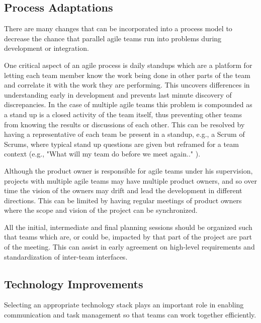 \subsection{Process Adaptations} 
\label{sec:proc_impv}
	There are many changes \cite{collabAcrossAgile_article} that can be incorporated into a process model to decrease the chance that parallel agile teams run into problems during development or integration.

One critical aspect of an agile process is daily standups which are a platform for letting each team member know the work being done in other parts of the team and correlate it with the work they are performing.
This uncovers differences in understanding early in development and prevents last minute discovery of discrepancies.
In the case of multiple agile teams this problem is compounded as a stand up is a closed activity of the team itself, thus preventing other teams from knowing the results or discussions of each other.
This can be resolved by having a representative of each team be present in a standup, e.g., a Scrum of Scrums, where typical stand up questions are given but reframed for a team context (e.g., "What will my team do before we meet again.." \cite{Rubin12}).

Although the product owner is responsible for agile teams under his supervision, projects with multiple agile teams may have multiple product owners, and so over time the vision of the owners may drift and lead the development in different directions.
This can be limited by having regular meetings of product owners where the scope and vision of the project can be synchronized.

All the initial, intermediate and final planning sessions should be organized such that teams which are, or could be, impacted by that part of the project are part of the meeting.
This can assist in early agreement on high-level requirements and standardization of inter-team interfaces.

\subsection{Technology Improvements} \label{sec:tech_impv}
Selecting an appropriate technology stack plays an important role in enabling communication and task management so that teams can work together efficiently.

